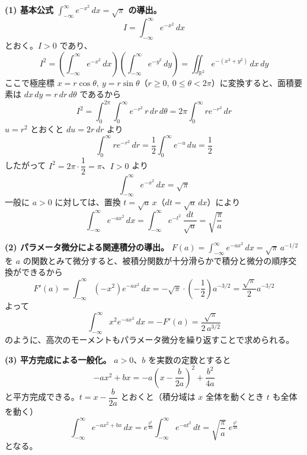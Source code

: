 \documentclass[a4paper,11pt]{article}
\begin{document}


\noindent
\textbf{(1) 基本公式 $\displaystyle\int_{-\infty}^{\infty} e^{-x^{2}}\,dx = \sqrt{\pi}$ の導出。}
\[
I = \int_{-\infty}^{\infty} e^{-x^{2}}\, dx
\]
とおく。$I > 0$ であり、
\[
I^{2} = \left(\int_{-\infty}^{\infty} e^{-x^{2}}\, dx\right)\left(\int_{-\infty}^{\infty} e^{-y^{2}}\, dy\right)
= \iint_{\mathbb{R}^{2}} e^{-(x^{2}+y^{2})}\, dx\, dy
\]
ここで極座標 $x = r\cos\theta,\ y = r\sin\theta$（$r \ge 0,\ 0 \le \theta < 2\pi$）に変換すると、面積要素は $dx\,dy = r\, dr\, d\theta$ であるから
\[
I^{2} = \int_{0}^{2\pi}\!\! \int_{0}^{\infty} e^{-r^{2}}\, r\, dr\, d\theta
= 2\pi \int_{0}^{\infty} r e^{-r^{2}}\, dr
\]
$u = r^{2}$ とおくと $du = 2r\, dr$ より
\[
\int_{0}^{\infty} r e^{-r^{2}}\, dr = \frac{1}{2}\int_{0}^{\infty} e^{-u}\, du = \frac{1}{2}
\]
したがって $I^{2} = 2\pi \cdot \dfrac{1}{2} = \pi$、$I > 0$ より
\[
\int_{-\infty}^{\infty} e^{-x^{2}}\, dx = \sqrt{\pi}
\]
一般に $a > 0$ に対しては、置換 $t = \sqrt{a}\, x$（$dt = \sqrt{a}\, dx$）により
\[
\int_{-\infty}^{\infty} e^{-a x^{2}}\, dx = \int_{-\infty}^{\infty} e^{-t^{2}}\, \frac{dt}{\sqrt{a}} = \sqrt{\frac{\pi}{a}}
\]

\noindent
\textbf{(2) パラメータ微分による関連積分の導出。}
$\displaystyle F(a) = \int_{-\infty}^{\infty} e^{-a x^{2}}\, dx = \sqrt{\pi}\, a^{-1/2}$ を $a$ の関数とみて微分すると、被積分関数が十分滑らかで積分と微分の順序交換ができるから
\[
F'(a) = \int_{-\infty}^{\infty} (-x^{2}) e^{-a x^{2}}\, dx = -\sqrt{\pi}\cdot\left(-\frac{1}{2}\right) a^{-3/2} = \frac{\sqrt{\pi}}{2} a^{-3/2}
\]
よって
\[
\int_{-\infty}^{\infty} x^{2} e^{-a x^{2}}\, dx = -F'(a) = \frac{\sqrt{\pi}}{2\, a^{3/2}}
\]
のように、高次のモーメントもパラメータ微分を繰り返すことで求められる。

\noindent
\textbf{(3) 平方完成による一般化。}
$a > 0$、$b$ を実数の定数とすると
\[
-a x^{2} + b x = -a\left(x - \frac{b}{2a}\right)^{2} + \frac{b^{2}}{4a}
\]
と平方完成できる。$t = x - \dfrac{b}{2a}$ とおくと（積分域は $x$ 全体を動くとき $t$ も全体を動く）
\[
\int_{-\infty}^{\infty} e^{-a x^{2} + b x}\, dx
= e^{\frac{b^{2}}{4a}} \int_{-\infty}^{\infty} e^{-a t^{2}}\, dt
= \sqrt{\frac{\pi}{a}}\; e^{\frac{b^{2}}{4a}}
\]
となる。
\end{document}
